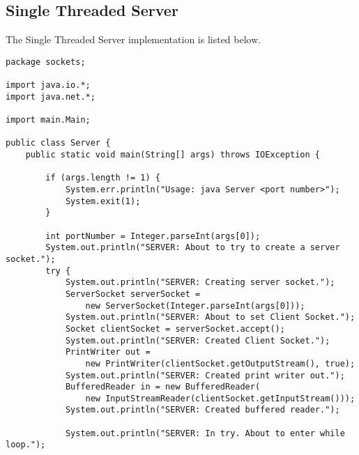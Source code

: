 \documentclass{article}
\begin{document}
	\subsection{Single Threaded Server}
	The Single Threaded Server implementation is listed below.
		\begin{lstlisting}
package sockets;

import java.io.*;
import java.net.*;

import main.Main;

public class Server {
    public static void main(String[] args) throws IOException {
        
        if (args.length != 1) {
            System.err.println("Usage: java Server <port number>");
            System.exit(1);
        }
        
        int portNumber = Integer.parseInt(args[0]);
    	System.out.println("SERVER: About to try to create a server socket.");
        try {
       		System.out.println("SERVER: Creating server socket.");
            ServerSocket serverSocket =
                new ServerSocket(Integer.parseInt(args[0]));
            System.out.println("SERVER: About to set Client Socket.");
            Socket clientSocket = serverSocket.accept();
            System.out.println("SERVER: Created Client Socket.");
            PrintWriter out =
                new PrintWriter(clientSocket.getOutputStream(), true);
            System.out.println("SERVER: Created print writer out.");
            BufferedReader in = new BufferedReader(
                new InputStreamReader(clientSocket.getInputStream()));
            System.out.println("SERVER: Created buffered reader.");
            
            System.out.println("SERVER: In try. About to enter while loop.");


\end{lstlisting}
\end{document}
